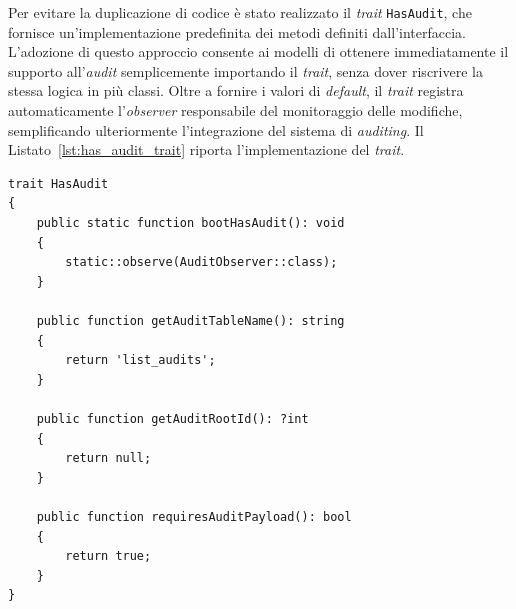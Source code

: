 Per evitare la duplicazione di codice è stato realizzato il \textit{trait} \texttt{HasAudit}, che fornisce un'implementazione predefinita dei metodi definiti dall'interfaccia. L'adozione di questo approccio consente ai modelli di ottenere immediatamente il supporto all'\textit{audit} semplicemente importando il \textit{trait}, senza dover riscrivere la stessa logica in più classi. Oltre a fornire i valori di \textit{default}, il \textit{trait} registra automaticamente l'\textit{observer} responsabile del monitoraggio delle modifiche, semplificando ulteriormente l'integrazione del sistema di \textit{auditing}. Il Listato~\ref{lst:has_audit_trait} riporta l'implementazione del \textit{trait}.

\begin{lstlisting}[float=!t, caption={Implementazione del trait HasAudit e dell'automazione di boot per l'osservazione.}, captionpos=b, label={lst:has_audit_trait}, basicstyle=\ttfamily\footnotesize, lineskip=-1pt, breaklines=true, breakatwhitespace=true]
trait HasAudit
{
	public static function bootHasAudit(): void
	{
		static::observe(AuditObserver::class);
	}
	
	public function getAuditTableName(): string
	{
		return 'list_audits';
	}
	
	public function getAuditRootId(): ?int
	{
		return null;
	}
	
	public function requiresAuditPayload(): bool
	{
		return true;
	}
}
\end{lstlisting}

